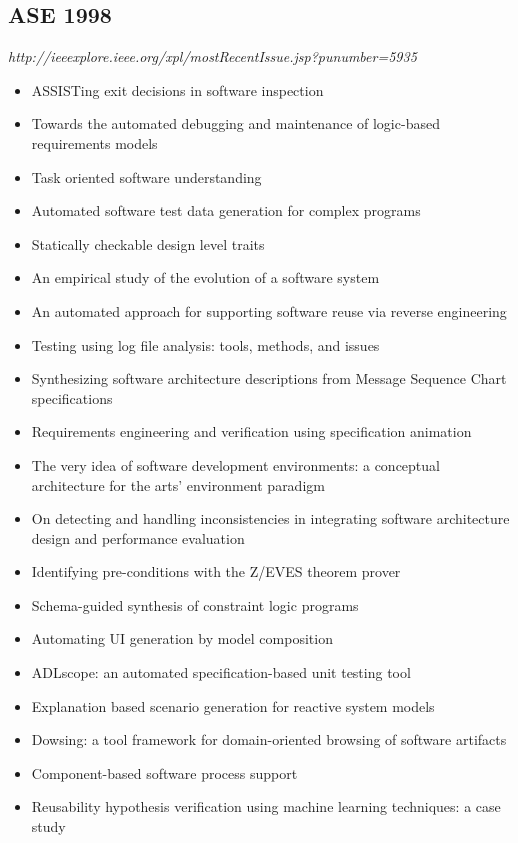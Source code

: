 \subsection{ASE 1998}

{\small \em http://ieeexplore.ieee.org/xpl/mostRecentIssue.jsp?punumber=5935}

{\small
\begin{itemize}[itemsep=-1ex]
  \item ASSISTing exit decisions in software inspection
  \item Towards the automated debugging and maintenance of logic-based requirements models
  \item Task oriented software understanding
  \item Automated software test data generation for complex programs
  \item Statically checkable design level traits
  \item An empirical study of the evolution of a software system
  \item An automated approach for supporting software reuse via reverse engineering
  \item Testing using log file analysis: tools, methods, and issues
  \item Synthesizing software architecture descriptions from Message Sequence Chart specifications
  \item Requirements engineering and verification using specification animation
  \item The very idea of software development environments: a conceptual architecture for the arts' environment paradigm
  \item On detecting and handling inconsistencies in integrating software architecture design and performance evaluation
  \item Identifying pre-conditions with the Z/EVES theorem prover
  \item Schema-guided synthesis of constraint logic programs
  \item Automating UI generation by model composition
  \item ADLscope: an automated specification-based unit testing tool
  \item Explanation based scenario generation for reactive system models
  \item Dowsing: a tool framework for domain-oriented browsing of software artifacts
  \item Component-based software process support
  \item Reusability hypothesis verification using machine learning techniques: a case study

\end{itemize}}
